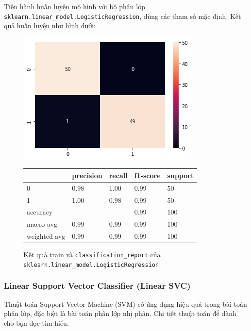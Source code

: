 \documentclass[12pt]{article}
\begin{document}
Tiến hành huấn luyện mô hình với bộ phân lớp \texttt{sklearn.linear\_model.LogisticRegression}, dùng các tham số mặc định. Kết quả huấn luyện như hình dưới:
\begin{figure}[H]
	\begin{multicols}{2}
		\includegraphics[scale=.5]{img/train-lr-result.png}

		\begin{table}[H]
			\begin{tabular}{l l l l l}
				\hline
				& precision & recall & f1-score & support \\
				\hline
				0 & 0.98 & 1.00 & 0.99 & 50 \\
				1 & 1.00 & 0.98 & 0.99 & 50 \\
				accuracy &   &   & 0.99 & 100 \\
				macro avg & 0.99 & 0.99 & 0.99 & 100 \\
				weighted avg & 0.99 & 0.99 & 0.99 & 100 \\
				\hline
			\end{tabular}
		\end{table}
	\end{multicols}
	\caption{Kết quả train và \texttt{classification\_report} của \texttt{sklearn.linear\_model.LogisticRegression}}
\end{figure}

\subsubsection{Linear Support Vector Classifier (Linear SVC)}
Thuật toán Support Vector Machine (SVM) có ứng dụng hiệu quả trong bài toán phân lớp, đặc biệt là bài toán phân lớp nhị phân. Chi tiết thuật toán để dành cho bạn đọc tìm hiểu.
\end{document}

